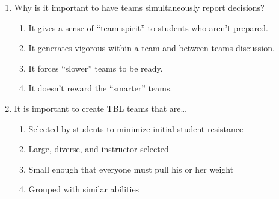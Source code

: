 \documentclass{article}
\begin{document}
\begin{enumerate}[itemsep=0.5in]
\item Why is it important to have teams simultaneously report decisions?
                  \begin{enumerate}[label=\Alph*)]
\item It gives a sense of ``team spirit'' to students who aren’t prepared.
\item It generates vigorous within-a-team and between teams discussion.%
\item It forces ``slower'' teams to be ready.
\item It doesn’t reward the ``smarter'' teams.
\end{enumerate}


\item 
It is important to create TBL teams that are…
\begin{enumerate}[label=\Alph*)]
\item Selected by students to minimize initial student resistance
\item Large, diverse, and instructor selected %
\item Small enough that everyone must pull his or her weight
\item Grouped with similar abilities 
\end{enumerate}



\end{enumerate}
\end{document}
